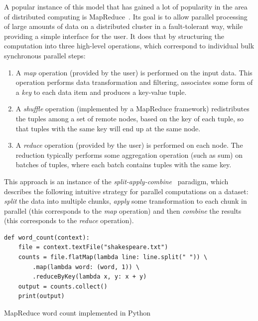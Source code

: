 A popular instance of this model that has gained a lot of popularity in the area of distributed
computing is MapReduce~\cite{mapreduce}. Its goal is to allow parallel processing of large
amounts of data on a distributed cluster in a fault-tolerant way, while providing a simple
interface for the user. It does that by structuring the computation into three high-level
operations, which correspond to individual bulk synchronous parallel steps:
\begin{enumerate}
	\item A \emph{map} operation (provided by the user) is performed on the input data. This
	      operation performs data transformation and filtering, associates some form of a
	      \emph{key} to each data item and produces a key-value tuple.
	\item A \emph{shuffle} operation (implemented by a MapReduce framework) redistributes the tuples
	      among a set of remote nodes, based on the key of each tuple, so that tuples with the same key will
	      end up at the same node.
	\item A \emph{reduce} operation (provided by the user) is performed on each node. The reduction
	      typically performs some aggregation operation (such as sum) on batches of tuples, where each batch
	      contains tuples with the same key.
\end{enumerate}

This approach is an instance of the \emph{split-apply-combine}~\cite{split_apply_combine} paradigm, which
describes the following intuitive strategy for parallel computations on a dataset:
\emph{split} the data into multiple chunks, \emph{apply} some transformation
to each chunk in parallel (this corresponds to the \emph{map} operation) and then
\emph{combine} the results (this corresponds to the \emph{reduce} operation).

\begin{listing}
	\begin{verbatim}
def word_count(context):
	file = context.textFile("shakespeare.txt")
	counts = file.flatMap(lambda line: line.split(" ")) \
		.map(lambda word: (word, 1)) \
		.reduceByKey(lambda x, y: x + y)
	output = counts.collect()
	print(output)
	\end{verbatim}
	\caption{MapReduce word count implemented in Python}
	\label{lst:wordcount-example}
\end{listing}

